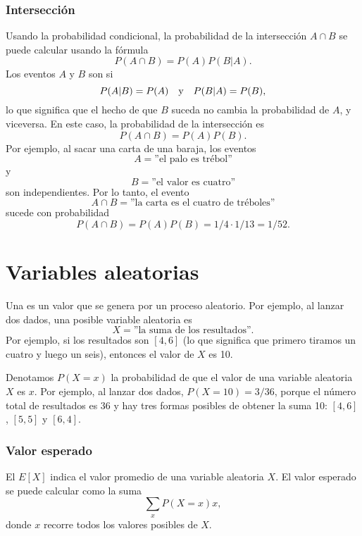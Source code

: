 \subsubsection{Intersección}


Usando la probabilidad condicional,
la probabilidad de la intersección
$A \cap B$ se puede calcular usando la fórmula
\[P(A \cap B)=P(A)P(B|A).\]
Los eventos $A$ y $B$ son  si
\[P(A|B)=P(A) \hspace{10px}\textrm{y}\hspace{10px} P(B|A)=P(B),\]
lo que significa que el hecho de que $B$ suceda no
cambia la probabilidad de $A$, y viceversa.
En este caso, la probabilidad de la intersección es
\[P(A \cap B)=P(A)P(B).\]
Por ejemplo, al sacar una carta de una baraja, los eventos
\[A = \textrm{''el palo es trébol''}\]
y
\[B = \textrm{''el valor es cuatro''}\]
son independientes. Por lo tanto, el evento
\[A \cap B = \textrm{''la carta es el cuatro de tréboles''}\]
sucede con probabilidad
\[P(A \cap B)=P(A)P(B)=1/4 \cdot 1/13 = 1/52.\]

\section{Variables aleatorias}


Una  es un valor que se genera
por un proceso aleatorio.
Por ejemplo, al lanzar dos dados,
una posible variable aleatoria es
\[X=\textrm{''la suma de los resultados''}.\]
Por ejemplo, si los resultados son $[4,6]$
(lo que significa que primero tiramos un cuatro y luego un seis),
entonces el valor de $X$ es 10.

Denotamos $P(X=x)$ la probabilidad de que
el valor de una variable aleatoria $X$ es $x$.
Por ejemplo, al lanzar dos dados,
$P(X=10)=3/36$,
porque el número total de resultados es 36
y hay tres formas posibles de obtener
la suma 10: $[4,6]$, $[5,5]$ y $[6,4]$.

\subsubsection{Valor esperado}


El  $E[X]$ indica el
valor promedio de una variable aleatoria $X$.
El valor esperado se puede calcular como la suma
\[\sum_x P(X=x)x,\]
donde $x$ recorre todos los valores posibles de $X$.


